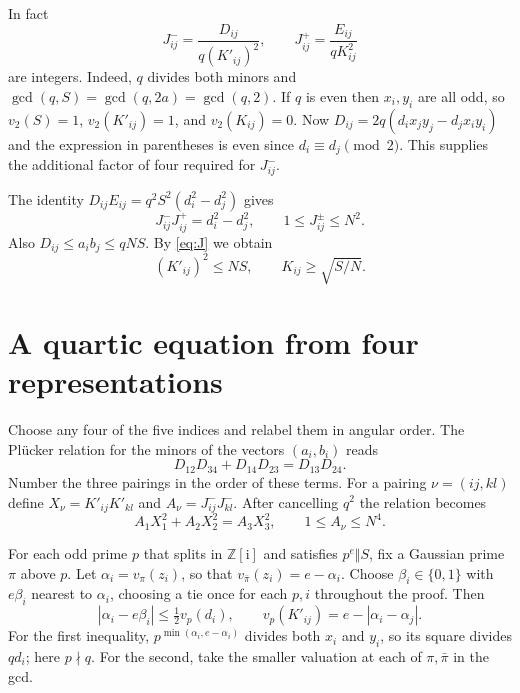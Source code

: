 \documentclass[11pt,reqno]{amsart}
\newcommand{\ii}{\mathrm{i}}
\newcommand{\Z}{\mathbb{Z}}
\begin{document}
In fact
\begin{equation}\label{eq:J}
 J^-_{ij}=\frac{D_{ij}}{q(K'_{ij})^2},\qquad
 J^+_{ij}=\frac{E_{ij}}{qK_{ij}^2}
\end{equation}
are integers. Indeed, $q$ divides both minors and
$\gcd(q,S)=\gcd(q,2a)=\gcd(q,2)$.
If $q$ is even then $x_i,y_i$ are all odd, so $v_2(S)=1$,
$v_2(K'_{ij})=1$, and $v_2(K_{ij})=0$. Now
$D_{ij}=2q(d_i x_j y_j-d_j x_i y_i)$ and the expression in parentheses
is even since $d_i\equiv d_j\pmod2$. This supplies the additional
factor of four required for $J^-_{ij}$.

The identity $D_{ij}E_{ij}=q^2 S^2(d_i^2-d_j^2)$ gives
\begin{equation}\label{eq:J-bound}
 J^-_{ij}J^+_{ij}=d_i^2-d_j^2,\qquad
 1\le J^\pm_{ij}\le N^2.
\end{equation}
Also $D_{ij}\le a_i b_j\le qNS$. By \eqref{eq:J} we obtain
\begin{equation}\label{eq:K-bound}
 (K'_{ij})^2\le NS,\qquad K_{ij}\ge\sqrt{S/N}.
\end{equation}

\section{A quartic equation from four representations}

Choose any four of the five indices and relabel them in angular order.
The Pl\"ucker relation for the minors of the vectors $(a_i,b_i)$ reads
\[
 D_{12}D_{34}+D_{14}D_{23}=D_{13}D_{24}.
\]
Number the three pairings in the order of these terms. For a pairing
$\nu=(ij,kl)$ define $X_\nu=K'_{ij}K'_{kl}$ and $A_\nu=J^-_{ij}J^-_{kl}$.
After cancelling $q^2$ the relation becomes
\begin{equation}\label{eq:plucker}
 A_1X_1^2+A_2X_2^2=A_3X_3^2,\qquad 1\le A_\nu\le N^4.
\end{equation}

For each odd prime $p$ that splits in $\Z[\ii]$ and satisfies
$p^e\Vert S$, fix a Gaussian prime $\pi$ above $p$.
Let $\alpha_i=v_\pi(z_i)$, so that
$v_{\bar\pi}(z_i)=e-\alpha_i$. Choose $\beta_i\in\{0,1\}$ with
$e\beta_i$ nearest to $\alpha_i$, choosing a tie once for each $p,i$
throughout the proof. Then
\begin{equation}\label{eq:valuation}
 |\alpha_i-e\beta_i|\le\tfrac12 v_p(d_i),\qquad
 v_p(K'_{ij})=e-|\alpha_i-\alpha_j|.
\end{equation}
For the first inequality, $p^{\min(\alpha_i,e-\alpha_i)}$ divides both
$x_i$ and $y_i$, so its square divides $qd_i$; here $p\nmid q$.
For the second, take the smaller
valuation at each of $\pi,\bar\pi$ in the gcd.
\end{document}
